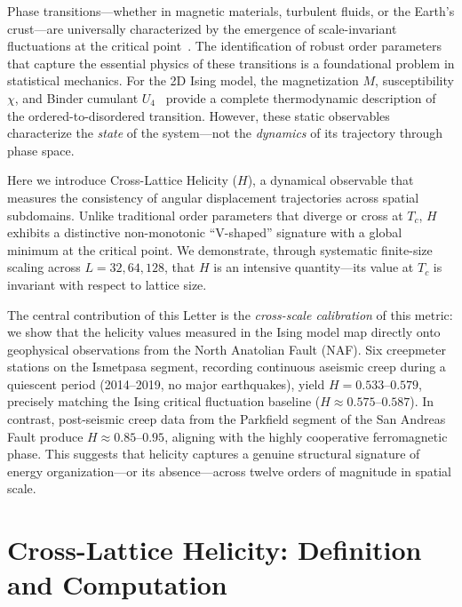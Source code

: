 \documentclass[aps,prl,twocolumn,superscriptaddress,byrevtex]{article}
\begin{document}
Phase transitions---whether in magnetic materials, turbulent fluids, or the Earth's
crust---are universally characterized by the emergence of scale-invariant fluctuations
at the critical point~\cite{onsager1944,wilson1974}. The identification of robust order
parameters that capture the essential physics of these transitions is a foundational problem
in statistical mechanics. For the 2D Ising model, the magnetization $M$, susceptibility
$\chi$, and Binder cumulant $U_4$~\cite{binder1981} provide a complete thermodynamic
description of the ordered-to-disordered transition. However, these static observables
characterize the \emph{state} of the system---not the \emph{dynamics} of its trajectory
through phase space.

Here we introduce Cross-Lattice Helicity ($H$), a dynamical observable that measures the
consistency of angular displacement trajectories across spatial subdomains. Unlike
traditional order parameters that diverge or cross at $T_c$, $H$ exhibits a distinctive
non-monotonic ``V-shaped'' signature with a global minimum at the critical point. We
demonstrate, through systematic finite-size scaling across $L = 32, 64, 128$, that $H$
is an intensive quantity---its value at $T_c$ is invariant with respect to lattice size.

The central contribution of this Letter is the \emph{cross-scale calibration} of this
metric: we show that the helicity values measured in the Ising model map directly onto
geophysical observations from the North Anatolian Fault (NAF). Six creepmeter stations
on the Ismetpasa segment, recording continuous aseismic creep during a quiescent period
(2014--2019, no major earthquakes), yield $H = 0.533$--$0.579$, precisely matching the
Ising critical fluctuation baseline ($H \approx 0.575$--$0.587$). In contrast,
post-seismic creep data from the Parkfield segment of the San Andreas Fault produce
$H \approx 0.85$--$0.95$, aligning with the highly cooperative ferromagnetic phase.
This suggests that helicity captures a genuine structural signature of energy
organization---or its absence---across twelve orders of magnitude in spatial scale.

\section{Cross-Lattice Helicity: Definition and Computation}
\end{document}
